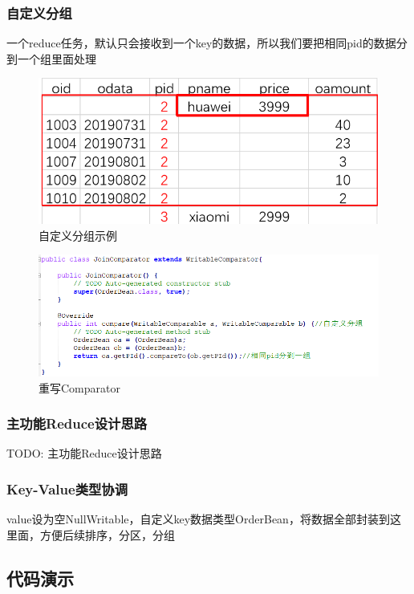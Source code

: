 \documentclass[a4paper,UTF8]{article}
\numberwithin{equation}{section}
\begin{document}
\subsubsection{自定义分组}
一个reduce任务，默认只会接收到一个key的数据，所以我们要把相同pid的数据分到一个组里面处理
\begin{figure}[H]
    \centering

    \includegraphics[width = 15cm]{comp1.png}

    \caption{自定义分组示例}
\end{figure}
\begin{figure}[H]
    \centering

    \includegraphics[width = 15cm]{comp2.png}

    \caption{重写Comparator}
\end{figure}
\subsubsection{主功能Reduce设计思路}
TODO:   主功能Reduce设计思路


\subsubsection{Key-Value类型协调}
value设为空NullWritable，自定义key数据类型OrderBean，将数据全部封装到这里面，方便后续排序，分区，分组
\subsection{代码演示}
\end{document}
